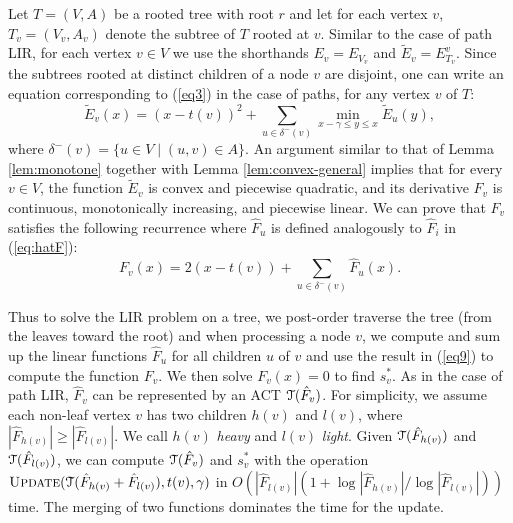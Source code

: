\documentclass[11pt]{article}
\def\TT{\EuScript{T}}
\def\Update{\mathop{\textsc{Update}}}
\newcommand{\hF}{\hat{F}}
\begin{document}
Let $T = (V, A)$ be a rooted tree with root $r$ and let for each vertex $v$, $T_v = (V_v, A_v)$ denote the subtree of $T$ rooted at $v$. Similar to the case of path LIR, for each vertex $v \in V$ we use the shorthands $E_v = E_{V_v}$ and $\tilde E_v = E_{T_v}^v$. Since the subtrees rooted at distinct children of a node $v$ are disjoint, 
one can  write an equation corresponding to (\ref{eq3}) in the case of paths, for any vertex $v$ of $T$:
\begin{equation}\label{eqte-tree}
\tilde E_{v}(x)  = (x - t(v))^2 +  \sum_{u \in \delta^-(v)}\min_{x - \gamma \leq y \leq x}\tilde E_{u}(y), 
\end{equation}
where $\delta^-(v) = \{u \in V \mid (u, v) \in A\}$.
An argument similar to that of Lemma \ref{lem:monotone} together with Lemma \ref{lem:convex-general} implies that 
for every $v \in V$, the function $\tilde E_v$ is convex and piecewise quadratic, and its derivative $F_v$ is continuous, monotonically increasing, and piecewise linear.
We can prove that $F_v$ satisfies the following recurrence where $\hF_u$ is defined analogously to $\hF_i$ in (\ref{eq:hatF}): 
\begin{equation}\label{eq9}
F_v(x) = 2(x - t(v)) + \sum_{u \in \delta^-(v)} \hF_{u}(x).
\end{equation}


Thus to solve the LIR problem on a tree, we post-order traverse the tree (from the leaves toward the root) and when processing a node $v$, we compute and sum up the linear functions $\hF_{u}$ for all children $u$ of $v$ and use the result in (\ref{eq9}) to compute the function $F_v$. We then solve $F_v(x) = 0$ to find $s^*_v$. As in the case of path LIR, $\hF_v$ can be represented by an ACT $\TT(\hF_v)$. For simplicity, we assume each non-leaf vertex $v$ has two children $h(v)$ and $l(v)$, where $|\hF_{h(v)}| \geq |\hF_{l(v)}|$.  We call $h(v)$ \emph{heavy} and $l(v)$ \emph{light}.  Given $\TT(\hF_{h(v)})$ and $\TT(\hF_{l(v)})$, we can compute $\TT(\hF_v)$ and $s_v^*$ with the operation $\Update(\TT(\hF_{h(v)} + \hF_{l(v)}), t(v), \gamma)$ in $O(|\hF_{l(v)}| (1 + \log |\hF_{h(v)}|/\log |\hF_{l(v)}|))$ time.  The merging of two functions dominates the time for the update.
\end{document}
